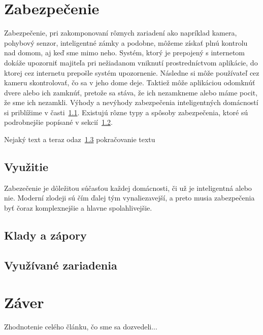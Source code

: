 \documentclass[10pt,twoside,slovak,a4paper]{article}
\begin{document}
\section{Zabezpečenie}\label{zabezpečenie}

Zabezpečenie, pri zakomponovaní rôznych zariadení ako napríklad kamera, pohybový senzor, inteligentné zámky a podobne, môžeme získať plnú kontrolu nad domom, aj keď sme mimo neho. Systém, ktorý je prepojený s internetom dokáže upozorniť majiteľa pri nežiadanom vniknutí prostredníctvom aplikácie, do ktorej cez internetu prepošle systém upozornenie. Následne si môže používateľ cez kameru skontrolovať, čo sa v jeho dome deje. Taktiež môže aplikáciou odomknúť dvere alebo ich zamknúť, pretože sa stáva, že ich nezamkneme alebo máme pocit, že sme ich nezamkli. Výhody a nevýhody zabezpečenia inteligentných domácností si priblížime v časti~\ref{zabezpečenie:vyhody}. Existujú rôzne typy a spôsoby zabezpečenia, ktoré sú podrobnejšie popísané v sekcií~\ref{zabezpečenie:druhy}.


Nejaký text a teraz odaz~\ref{zabezpečenie:nástroje} pokračovanie textu

\subsection{Využitie}\label{zabezpečenie:vyhody}

Zabezečenie je dôležitou súčasťou každej domácnosti, či už je inteligentná alebo nie. Moderní zlodeji sú čím ďalej tým vynaliezavejší, a preto musia zabezpečenia byť čoraz komplexnejšie a hlavne spolahlivejšie.

\subsection{Klady a zápory}\label{zabezpečenie:druhy}

\subsection{Využívané zariadenia}\label{zabezpečenie:nástroje}



\section{Záver} \label{zaver}

Zhodnotenie celého článku, čo sme sa dozvedeli...




\end{document}
